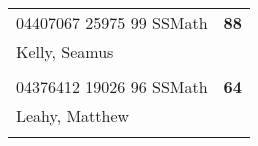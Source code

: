 \documentclass[a4paper,12pt]{article}
\begin{document}
\begin{tabular}{
   |p{9mm}|
    p{9mm}|
    p{9mm}|
    p{9mm}|
    p{9mm}|
    p{9mm}|
    p{9mm}|
    p{9mm}|
    p{9mm}|
    p{9mm}|}
      &    &    &    &    &    &    &    &    &     \\
\hline\hline
\multicolumn{9}{|l|}{04407067 25975 99 SSMath} & \textbf{88} \\
\hline
\multicolumn{10}{|l|}{Kelly, Seamus} \\
\hline
   \vrule height8mm width0pt depth2mm 
      &    &    &    &    &    &    &    &    &     \\
\hline\hline
\multicolumn{9}{|l|}{04376412 19026 96 SSMath} & \textbf{64} \\
\hline
\multicolumn{10}{|l|}{Leahy, Matthew} \\
\hline
   \vrule height8mm width0pt depth2mm 
      &    &    &    &    &    &    &    &    &     \\
\hline\hline
\end{tabular}
\newpage
\end{document}
